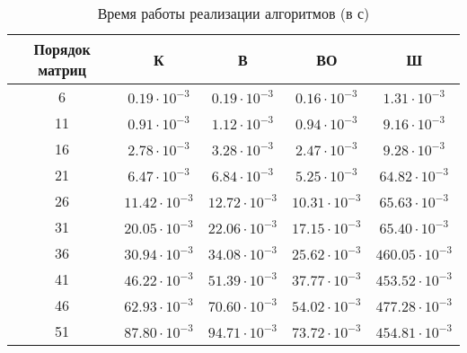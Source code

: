 \begin{table}[h]
	\begin{center}
		\begin{threeparttable}
			\captionsetup{justification=raggedright,singlelinecheck=off}
			\caption{Время работы реализации алгоритмов (в с)}
			\label{tbl:time_measurements}
			\begin{tabular}{|c|c|c|c|c|}
				\hline
				Порядок матриц & К & В & ВО & Ш \\
				\hline
				6 &$ 0.19\cdot 10^{-3} $&$ 0.19\cdot 10^{-3} $&$ 0.16\cdot 10^{-3} $&$ 1.31\cdot 10^{-3}$\\
				\hline
				11 &$ 0.91\cdot 10^{-3} $&$ 1.12\cdot 10^{-3} $&$ 0.94\cdot 10^{-3} $&$ 9.16\cdot 10^{-3}$\\
				\hline
				16 &$ 2.78\cdot 10^{-3} $&$ 3.28\cdot 10^{-3} $&$ 2.47\cdot 10^{-3} $&$ 9.28\cdot 10^{-3}$\\
				\hline
				21 &$ 6.47\cdot 10^{-3} $&$ 6.84\cdot 10^{-3} $&$ 5.25\cdot 10^{-3} $&$ 64.82\cdot 10^{-3}$\\
				\hline
				26 &$ 11.42\cdot 10^{-3} $&$ 12.72\cdot 10^{-3} $&$ 10.31\cdot 10^{-3} $&$ 65.63\cdot 10^{-3}$\\
				\hline
				31 &$ 20.05\cdot 10^{-3} $&$ 22.06\cdot 10^{-3} $&$ 17.15\cdot 10^{-3} $&$ 65.40\cdot 10^{-3}$\\
				\hline
				36 &$ 30.94\cdot 10^{-3} $&$ 34.08\cdot 10^{-3} $&$ 25.62\cdot 10^{-3} $&$ 460.05\cdot 10^{-3}$\\
				\hline
				41 &$ 46.22\cdot 10^{-3} $&$ 51.39\cdot 10^{-3} $&$ 37.77\cdot 10^{-3} $&$ 453.52\cdot 10^{-3}$\\
				\hline
				46 &$ 62.93\cdot 10^{-3} $&$ 70.60\cdot 10^{-3} $&$ 54.02\cdot 10^{-3} $&$ 477.28\cdot 10^{-3}$\\
				\hline
				51 &$ 87.80\cdot 10^{-3} $&$ 94.71\cdot 10^{-3} $&$ 73.72\cdot 10^{-3} $&$ 454.81\cdot 10^{-3}$\\
			\hline
			\end{tabular}
		\end{threeparttable}
	\end{center}
\end{table}

